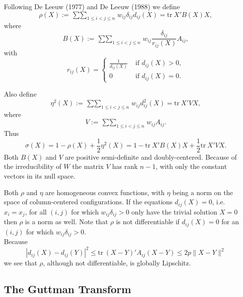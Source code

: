 \documentclass[
  12pt,
]{article}
\begin{document}
Following De Leeuw (1977) and De Leeuw (1988) we define
\begin{equation}
\rho(X):=\mathop{\sum\sum}_{1\leq i<j\leq n} w_{ij}\delta_{ij}d_{ij}(X)=\text{tr}\ X'B(X)X,
\label{eq:rhodef}
\end{equation}
where
\begin{equation}
B(X):=\mathop{\sum\sum}_{1\leq i<j\leq n}w_{ij}\frac{\delta_{ij}}{r_{ij}(X)}A_{ij},
\label{eq:bdef}
\end{equation}
with
\begin{equation}
r_{ij}(X)=\begin{cases}
\frac{1}{d_{ij}(X)}&\text{ if }d_{ij}(X)>0,\\
0&\text{ if }d_{ij}(X)=0.
\end{cases}
\label{eq:rdef}
\end{equation}

Also define
\begin{equation}
\eta^2(X):=\mathop{\sum\sum}_{1\leq i<j\leq n}w_{ij}d_{ij}^2(X)=\text{tr}\ X'VX,
\label{eq:etadef}
\end{equation}
where
\begin{equation}
V:=\mathop{\sum\sum}_{1\leq i<j\leq n}w_{ij}A_{ij}.
\label{eq:vdef}
\end{equation}
Thus
\begin{equation}
\sigma(X)=1-\rho(X)+\frac12\eta^2(X)=1-\text{tr}\ X'B(X)X+\frac12\text{tr}\ X'VX.
\label{eq:sform}
\end{equation}
Both \(B(X)\) and \(V\) are positive semi-definite and doubly-centered. Because of the irreducibility of \(W\) the matrix \(V\) has rank \(n-1\), with only the constant vectors in its null space.

Both \(\rho\) and \(\eta\) are homogeneous convex functions, with \(\eta\) being a
norm on the space of column-centered configurations. If the equations
\(d_{ij}(X)=0\), i.e.~\(x_i=x_j\), for all \((i,j)\) for which
\(w_{ij}\delta_{ij}>0\) only have the trivial solution \(X=0\) then
\(\rho\) is a norm as well. Note that \(\rho\) is not differentiable if
\(d_{ij}(X)=0\) for an \((i,j)\) for which \(w_{ij}\delta_{ij}>0\).\\
Because
\begin{equation}
|d_{ij}(X)-d_{ij}(Y)|^2\leq\text{tr}\ (X-Y)'A_{ij}(X-Y)\leq 2p\|X-Y\|^2
\label{eq:lipschitz}
\end{equation}
we see that \(\rho\), although not differentiable, is globally Lipschitz.

\subsection{The Guttman Transform}\label{the-guttman-transform}
\end{document}
